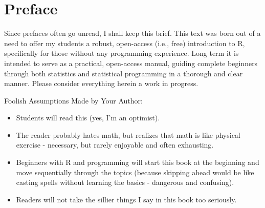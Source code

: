 \chapter*{Preface}
Since prefaces often go unread, I shall keep this brief. This text was born out of a need to offer my students a robust, open-access (i.e., free) introduction to R, specifically for those without any programming experience. Long term it is intended to serve as a practical, open-access manual, guiding complete beginners through both statistics and statistical programming in a thorough and clear manner. Please consider everything herein a work in progress.

\vspace{2em}

{
\headingfont \Large
\noindent Foolish Assumptions Made by Your Author:
\normalsize\normalfont
\begin{itemize}
    \item Students will read this (yes, I'm an optimist).
    \item The reader probably hates math, but realizes that math is like physical exercise - necessary, but rarely enjoyable and often exhausting.
    \item Beginners with R and programming will start this book at the beginning and move sequentially through the topics (because skipping ahead would be like casting spells without learning the basics - dangerous and confusing).
    \item Readers will not take the sillier things I say in this book too seriously.
\end{itemize}
}
